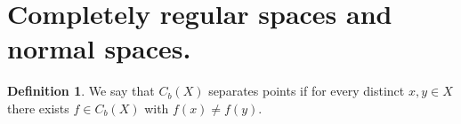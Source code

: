 \documentclass[11pt,a4paper]{article}
\theoremstyle{definition}
\newtheorem{definition}{Definition}[section]
\theoremstyle{plain}
\begin{document}
	\newpage
	
	\section{Completely regular spaces and normal spaces.}
	\begin{definition}
		We say that $C_b(X)$ separates points if for every distinct 
		$x, y \in X$ there exists $f \in C_b(X)$ with $f(x) \neq f(y)$.
	\end{definition}
  
	
	
	
	
	
\end{document}
